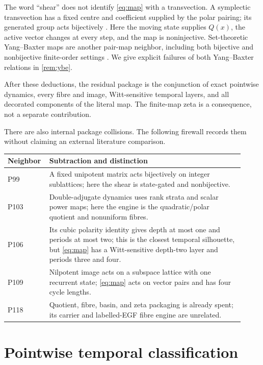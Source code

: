 \documentclass[10pt,a4paper]{amsart}
\theoremstyle{definition}
\theoremstyle{remark}
\numberwithin{equation}{section}
\begin{document}
The word ``shear'' does not identify \eqref{eq:map} with a transvection.
A symplectic transvection has a fixed centre and coefficient supplied by the
polar pairing; its generated group acts bijectively
\cite{Sjostrand2025}.  Here the moving state supplies \(Q(x)\), the active
vector changes at every step, and the map is noninjective.  Set-theoretic
Yang--Baxter maps are another pair-map neighbor, including both bijective
\cite{EtingofSchedlerSoloviev1999} and nonbijective finite-order settings
\cite{CatinoColazzoStefanelli2021}.  We give explicit failures of both
Yang--Baxter relations in \cref{rem:ybe}.

After these deductions, the residual package is the conjunction of exact
pointwise dynamics, every fibre and image, Witt-sensitive temporal layers,
and all decorated components of the literal map.  The finite-map zeta is a
consequence, not a separate contribution.

There are also internal package collisions.  The following firewall records
them without claiming an external literature comparison.
\begin{center}
\small
\begin{tabular}{@{}p{0.13\linewidth}p{0.79\linewidth}@{}}
\toprule
Neighbor & Subtraction and distinction\\
\midrule
P99 & A fixed unipotent matrix acts bijectively on integer sublattices; here
the shear is state-gated and nonbijective.\\
P103 & Double-adjugate dynamics uses rank strata and scalar power maps; here
the engine is the quadratic/polar quotient and nonuniform fibres.\\
P106 & Its cubic polarity identity gives depth at most one and periods at
most two; this is the closest temporal silhouette, but \eqref{eq:map} has a
Witt-sensitive depth-two layer and periods three and four.\\
P109 & Nilpotent image acts on a subspace lattice with one recurrent state;
\eqref{eq:map} acts on vector pairs and has four cycle lengths.\\
P118 & Quotient, fibre, basin, and zeta packaging is already spent; its
carrier and labelled-EGF fibre engine are unrelated.\\
\bottomrule
\end{tabular}
\end{center}

\section{Pointwise temporal classification}
\end{document}
